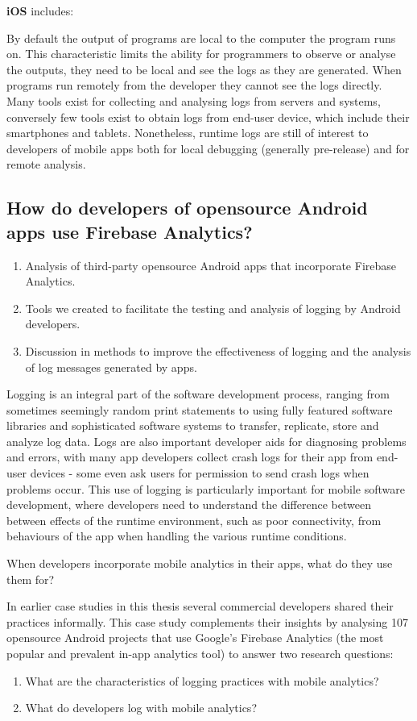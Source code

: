 \textbf{iOS} includes: 

By default the output of programs are local to the computer the program runs on. This characteristic limits the ability for programmers to observe or analyse the outputs, they need to be local and see the logs as they are generated. 
%
When programs run remotely from the developer they cannot see the logs directly. Many tools exist for collecting and analysing logs from servers and systems, conversely few tools exist to obtain logs from end-user device, which include their smartphones and tablets. Nonetheless, runtime logs are still of interest to developers of mobile apps both for local debugging (generally pre-release) and for remote analysis.



\subsection{How do developers of opensource Android apps use Firebase Analytics?}
\begin{enumerate}
    \item Analysis of third-party opensource Android apps that incorporate Firebase Analytics.
    \item Tools we created to facilitate the testing and analysis of logging by Android developers.
    \item Discussion in methods to improve the effectiveness of logging and the analysis of log messages generated by apps.
\end{enumerate}

Logging is an integral part of the software development process, ranging from sometimes seemingly random print statements to using fully featured software libraries and sophisticated software systems to transfer, replicate, store and analyze log data. Logs are also important developer aids for diagnosing problems and errors, with many app developers collect crash logs for their app from end-user devices - some even ask users for permission to send crash logs when problems occur.  This use of logging is particularly important for mobile software development, where developers need to understand the difference between between effects of the runtime environment, such as poor connectivity, from behaviours of the app when handling the various runtime conditions.

When developers incorporate mobile analytics in their apps, what do they use them for? 

In earlier case studies in this thesis several commercial developers shared their practices informally. This case study complements their insights by analysing 107 opensource Android projects that use Google's Firebase Analytics (the most popular and prevalent in-app analytics tool) to answer two research questions:
\begin{enumerate}
    \item What are the characteristics of logging practices with mobile analytics?
    \item What do developers log with mobile analytics?
\end{enumerate}

